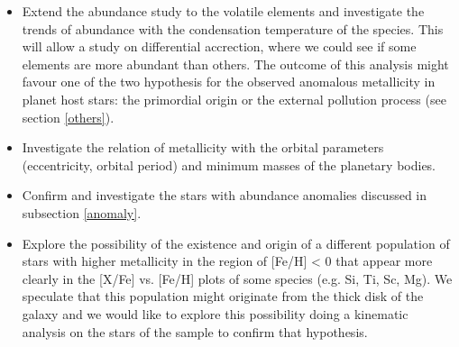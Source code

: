 \documentclass[dvips,12pt,a4paper]{report}
\begin{document}
{{\begin{itemize}
\item Extend the abundance study to the volatile elements and investigate the trends of abundance with the condensation temperature of the species. This will allow a study on differential accrection, where we could see if some elements are more abundant than others. The outcome of this analysis might favour one of the two hypothesis for the observed anomalous metallicity in planet host stars: the primordial origin or the external pollution process (see section \ref{others}). 

\item Investigate the relation of metallicity with the orbital parameters (eccentricity, orbital period) and minimum masses of the planetary bodies.

\item Confirm and investigate the stars with abundance anomalies discussed in subsection \ref{anomaly}.

\item Explore the possibility of the existence and origin of a different population of stars with higher metallicity in the region of [Fe/H] < 0 that appear more clearly in the [X/Fe] vs. [Fe/H] plots of some species (e.g. Si, Ti, Sc, Mg). We speculate that this population might originate from the thick disk of the galaxy and we would like to explore this possibility doing a kinematic analysis on the stars of the sample to confirm that hypothesis. 

\end{itemize}

 










}}
\end{document}
